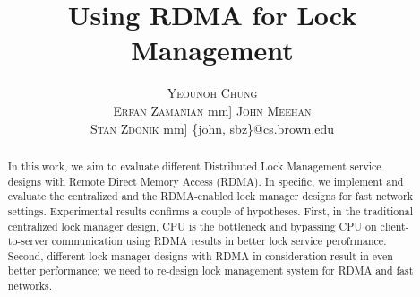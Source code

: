 \documentclass[twoside]{article}
\title{\vspace{-15mm}\fontsize{24pt}{10pt}\selectfont\textbf{Using RDMA for Lock Management}}
\author{
\normalsize{} 
\large
\textsc{Yeounoh Chung} \\
\textsc{Erfan Zamanian} \1mm]
\textsc{John Meehan} \\
\textsc{Stan Zdonik} \2mm]
\normalsize{\{john, sbz\}@cs.brown.edu}
\vspace{5mm}
}
\date{}
\begin{document}
\maketitle 

\thispagestyle{fancy} 






\begin{abstract}
In this work, we aim to evaluate different Distributed Lock Management service designs with Remote Direct Memory Access (RDMA). In specific, we implement and evaluate the centralized and the RDMA-enabled lock manager designs for fast network settings. Experimental results confirms a couple of hypotheses. First, in the traditional centralized lock manager design, CPU is the bottleneck and bypassing CPU on client-to-server communication using RDMA results in better lock service perofrmance. Second, different lock manager designs with RDMA in consideration result in even better performance; we need to re-design lock management system for RDMA and fast networks.
\end{abstract}
\end{document}
